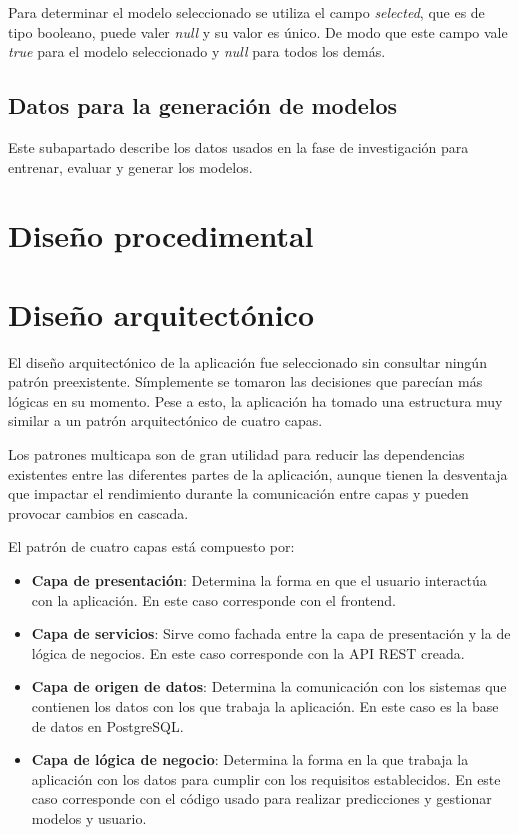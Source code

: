Para determinar el modelo seleccionado se utiliza el campo \textit{selected},
que es de tipo booleano, puede valer \textit{null} y su valor es único. De modo
que este campo vale \textit{true} para el modelo seleccionado y \textit{null}
para todos los demás.

\subsection{Datos para la generación de modelos}

Este subapartado describe los datos usados en la fase de investigación para
entrenar, evaluar y generar los modelos.

\section{Diseño procedimental}

\section{Diseño arquitectónico}

El diseño arquitectónico de la aplicación fue seleccionado sin consultar ningún
patrón preexistente. Símplemente se tomaron las decisiones que parecían más
lógicas en su momento. Pese a esto, la aplicación ha tomado una estructura muy
similar a un patrón arquitectónico de cuatro capas.

Los patrones multicapa son de gran utilidad para reducir las dependencias
existentes entre las diferentes partes de la aplicación, aunque tienen la
desventaja que impactar el rendimiento durante la comunicación entre capas y
pueden provocar cambios en cascada.

El patrón de cuatro capas está compuesto por:

\begin{itemize}
    \item \textbf{Capa de presentación}: Determina la forma en que el usuario
    interactúa con la aplicación. En este caso corresponde con el frontend.
    \item \textbf{Capa de servicios}: Sirve como fachada entre la capa de
    presentación y la de lógica de negocios. En este caso corresponde con la API
    REST creada.
    \item \textbf{Capa de origen de datos}: Determina la comunicación con los
    sistemas que contienen los datos con los que trabaja la aplicación. En este
    caso es la base de datos en PostgreSQL.
    \item \textbf{Capa de lógica de negocio}: Determina la forma en la que
    trabaja la aplicación con los datos para cumplir con los requisitos
    establecidos. En este caso corresponde con el código usado para realizar
    predicciones y gestionar modelos y usuario.
\end{itemize}
